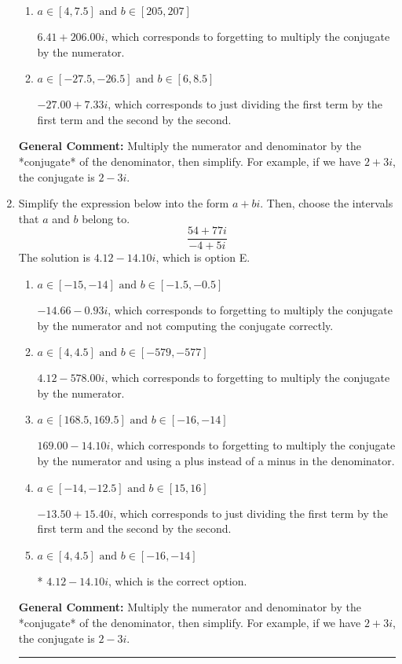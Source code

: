 \documentclass{extbook}[14pt]
\newcommand{\litem}[1]{\item #1

\rule{\textwidth}{0.4pt}}
\begin{document}
\begin{enumerate}
{\begin{enumerate}[label=\Alph*.]
 $-7.86  - 3.19 i$, which corresponds to forgetting to multiply the conjugate by the numerator and not computing the conjugate correctly.
\item \( a \in [4, 7.5] \text{ and } b \in [205, 207] \)

 $6.41  + 206.00 i$, which corresponds to forgetting to multiply the conjugate by the numerator.
\item \( a \in [-27.5, -26.5] \text{ and } b \in [6, 8.5] \)

 $-27.00  + 7.33 i$, which corresponds to just dividing the first term by the first term and the second by the second.
\end{enumerate}

\textbf{General Comment:} Multiply the numerator and denominator by the *conjugate* of the denominator, then simplify. For example, if we have $2+3i$, the conjugate is $2-3i$.
}
\litem{
Simplify the expression below into the form $a+bi$. Then, choose the intervals that $a$ and $b$ belong to.
\[ \frac{54 + 77 i}{-4 + 5 i} \]The solution is \( 4.12  - 14.10 i \), which is option E.\begin{enumerate}[label=\Alph*.]
\item \( a \in [-15, -14] \text{ and } b \in [-1.5, -0.5] \)

 $-14.66  - 0.93 i$, which corresponds to forgetting to multiply the conjugate by the numerator and not computing the conjugate correctly.
\item \( a \in [4, 4.5] \text{ and } b \in [-579, -577] \)

 $4.12  - 578.00 i$, which corresponds to forgetting to multiply the conjugate by the numerator.
\item \( a \in [168.5, 169.5] \text{ and } b \in [-16, -14] \)

 $169.00  - 14.10 i$, which corresponds to forgetting to multiply the conjugate by the numerator and using a plus instead of a minus in the denominator.
\item \( a \in [-14, -12.5] \text{ and } b \in [15, 16] \)

 $-13.50  + 15.40 i$, which corresponds to just dividing the first term by the first term and the second by the second.
\item \( a \in [4, 4.5] \text{ and } b \in [-16, -14] \)

* $4.12  - 14.10 i$, which is the correct option.
\end{enumerate}

\textbf{General Comment:} Multiply the numerator and denominator by the *conjugate* of the denominator, then simplify. For example, if we have $2+3i$, the conjugate is $2-3i$.
}
\end{enumerate}
\end{document}
